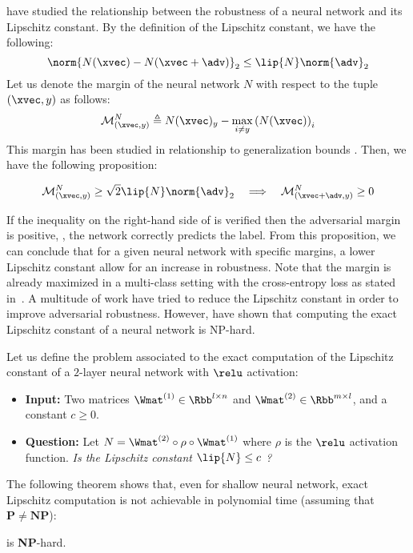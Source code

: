 \citet{tsuzuku2018lipschitz} have studied the relationship between the robustness of a neural network and its Lipschitz constant. 
By the definition of the Lipschitz constant, we have the following:
\begin{equation}
  \norm{N(\xvec) - N(\xvec + \adv)}_2 \leq \lip{N} \norm{\adv}_2
\end{equation}
Let us denote the margin of the neural network $N$ with respect to the tuple $(\xvec, y)$ as follows:
\begin{equation}
  \mathcal{M}^{N}_{(\xvec, y)} \triangleq N(\xvec)_y - \max_{i \neq y} \left( N(\xvec) \right)_i
\end{equation}
This margin has been studied in relationship to generalization bounds \cite{langford2002pac,bartlett2017spectrally,neyshabur2018pacbayesian}.
Then, we have the following proposition:
\begin{proposition}
  \begin{equation}
    \mathcal{M}^{N}_{(\xvec, y)} \geq \sqrt{2} \lip{N} \norm{\adv}_2 \quad \Longrightarrow \quad \mathcal{M}^{N}_{(\xvec + \adv, y)} \geq 0
    \label{equation:ch3-margin_guarded_area}
  \end{equation}
\end{proposition}
\noindent
If the inequality on the right-hand side of  is verified then the adversarial margin is positive, \ie, the network correctly predicts the label. 
From this proposition, we can conclude that for a given neural network with specific margins, a lower Lipschitz constant allow for an increase in robustness. 
Note that the margin is already maximized in a multi-class setting with the cross-entropy loss as stated in~\citet{hein2017formal}.
A multitude of work have tried to reduce the Lipschitz constant in order to improve adversarial robustness.
However, \citet{scaman2018lipschitz} have shown that computing the exact Lipschitz constant of a neural network is NP-hard.
\begin{problem}
  Let us define the problem associated to the exact computation of the Lipschitz constant of a $2$-layer neural network with $\relu$ activation:
  \begin{itemize}
    \item[] \textbf{Input:} Two matrices $\Wmat^{(1)} \in \Rbb^{l \times n}$ and $\Wmat^{(2)} \in \Rbb^{m \times l}$, and a constant $c \geq 0$.
    \item[] \textbf{Question:} Let $N = \Wmat^{(2)} \circ \rho \circ \Wmat^{(1)}$ where $\rho$ is the $\relu$ activation function. \emph{Is the Lipschitz constant $\lip{N} \leq c$ ?}
  \end{itemize}
  \label{problem:ch3-lipschitz_computation}
\end{problem}
\noindent
The following theorem shows that, even for shallow neural network, exact Lipschitz computation is not achievable in polynomial time (assuming that $\mathbf{P} \neq \textbf{NP}$):
\begin{theorem}
   is \textbf{NP}-hard.
\end{theorem}


